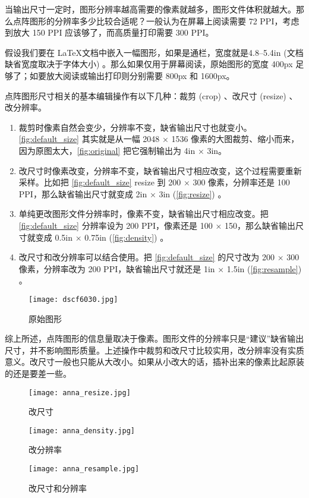 当输出尺寸一定时，图形分辨率越高需要的像素就越多，图形文件体积就越大。那么点阵图形的分辨率多少比较合适呢？一般认为在屏幕上阅读需要 72 PPI，考虑到放大 150 PPI 应该够了，而高质量打印需要 300 PPI。

假设我们要在 \LaTeX 文档中嵌入一幅图形，如果是通栏，宽度就是4.8--5.4in (文档缺省宽度取决于字体大小) 。那么如果仅用于屏幕阅读，原始图形的宽度 400px 足够了；如要放大阅读或输出打印则分别需要 800px 和 1600px。

点阵图形尺寸相关的基本编辑操作有以下几种：裁剪 (crop) 、改尺寸 (resize) 、改分辨率。

\begin{enumerate}
\item 裁剪时像素自然会变少，分辨率不变，缺省输出尺寸也就变小。\autoref{fig:default_size} 其实就是从一幅 2048 × 1536 像素的大图裁剪、缩小而来，因为原图太大，\autoref{fig:original} 把它强制输出为 4in × 3in。

\item 改尺寸时像素改变，分辨率不变，缺省输出尺寸相应改变，这个过程需要重新采样。比如把 \autoref{fig:default_size} resize 到 200 × 300 像素，分辨率还是 100 PPI，那么缺省输出尺寸就变成 2in × 3in (\autoref{fig:resize}) 。

\item 单纯更改图形文件分辨率时，像素不变，缺省输出尺寸相应改变。把 \autoref{fig:default_size} 分辨率设为 200 PPI，像素还是 100 × 150，那么缺省输出尺寸就变成 0.5in × 0.75in (\autoref{fig:density}) 。

\item 改尺寸和改分辨率可以结合使用。把 \autoref{fig:default_size} 的尺寸改为 200 × 300 像素，分辨率改为 200 PPI，缺省输出尺寸就还是 1in × 1.5in (\autoref{fig:resample}) 。
\end{enumerate}

\begin{figure}[htbp]
\centering
\texttt{[image: dscf6030.jpg]}
\caption{原始图形}
\label{fig:original}
\end{figure}

综上所述，点阵图形的信息量取决于像素。图形文件的分辨率只是“建议”缺省输出尺寸，并不影响图形质量。上述操作中裁剪和改尺寸比较实用，改分辨率没有实质意义。改尺寸一般也只能从大改小。如果从小改大的话，插补出来的像素比起原装的还是要差一些。

\begin{figure}[htbp]
\centering
\begin{minipage}[b]{2in}
\centering
\texttt{[image: anna\_resize.jpg]}
\caption{改尺寸}
\label{fig:resize}
\end{minipage}
\begin{minipage}[b]{1.1in}
\centering
\texttt{[image: anna\_density.jpg]}
\caption{改分辨率}
\label{fig:density}
\end{minipage}
\begin{minipage}[b]{1.6in}
\centering
\texttt{[image: anna\_resample.jpg]}
\caption{改尺寸和分辨率}
\label{fig:resample}
\end{minipage}
\end{figure}


